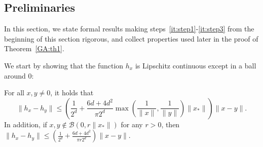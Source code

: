 %
%
%

\subsection{Preliminaries \label{sec:prelims}}

In this section, we state formal results making steps~\ref{it:step1}-\ref{it:step3} from the beginning of this section rigorous, and collect properties used later in the  proof of  Theorem~\ref{GA:th1}.

We  start by showing that the function $h_x$ is Lipschitz continuous except in a ball around $0$:

\begin{lemma} \label{GA:le4}
For all $x, y \neq 0$, it holds that
\begin{equation*}
\|h_{x} - h_{y}\| \leq \left(\frac{1}{2^d} + \frac{6 d + 4 d^2}{\pi 2^d} \max\left( \frac{1}{\|x\|}, \frac{1}{\|y\|} \right) \|x_*\|\right) \|x - y\|.
\end{equation*}
In addition, if $x, y \notin \mathcal{B}(0, r \|x_*\|)$ for any $r > 0$, then $\|h_{x} - h_{y}\| \leq \left(\frac{1}{2^d} + \frac{6 d + 4 d^2}{\pi r 2^d}\right) \|x - y\|$.
\end{lemma}


